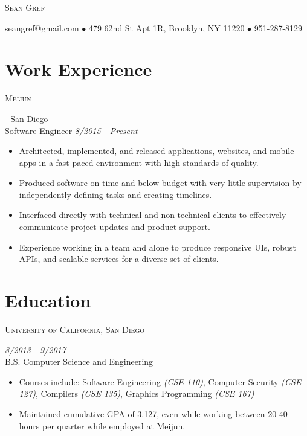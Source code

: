 \documentclass[letterpaper]{article} %
\begin{document}
\pagestyle{empty}


\par{\centering
		{\Huge\textsc{Sean Gref}
	}\bigskip\par}

\begin{center}
seangref@gmail.com $\bullet$ 479 62nd St Apt 1R, Brooklyn, NY 11220 $\bullet$ 951-287-8129
\end{center}



\section{Work Experience}
\vspace{0.5em}

\noindent\begin{large}\textsc{Meijun}\end{large} - San Diego\\
\indent Software Engineer \textit{8/2015 - Present}
\begin{itemize}
\item Architected, implemented, and released applications, websites, and mobile apps in a fast-paced environment with high standards of quality.
\item Produced software on time and below budget with very little supervision by independently defining tasks and creating timelines.
\item Interfaced directly with technical and non-technical clients to effectively communicate project updates and product support.
\item Experience working in a team and alone to produce responsive UIs, robust APIs, and scalable services for a diverse set of clients.
\end{itemize}

\section{Education}
\vspace{0.5em}
\noindent\begin{large}\textsc{University of California, San Diego}\end{large} \textit{8/2013 - 9/2017}
\\B.S. Computer Science and Engineering
\begin{itemize}
\item Courses include: Software Engineering \textit{(CSE 110)}, Computer Security \textit{(CSE 127)}, Compilers \textit{(CSE 135)}, Graphics Programming \textit{(CSE 167)}
\item Maintained cumulative GPA of 3.127, even while working between 20-40 hours per quarter while employed at Meijun.
\end{itemize}
\end{document}
